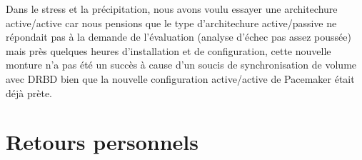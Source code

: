 \documentclass[11pt,a4paper]{report}
\begin{document}
            Dans le stress et la précipitation, nous avons voulu essayer une architechure active/active car nous pensions que le type d'architechure active/passive ne répondait pas à la demande de l'évaluation (analyse d'échec pas assez poussée) mais près quelques heures d'installation et de configuration, cette nouvelle monture n'a pas été un succès à cause d'un soucis de synchronisation de volume avec DRBD bien que la nouvelle configuration active/active de Pacemaker était déjà prète.
        
        \section{Retours personnels}
\end{document}
